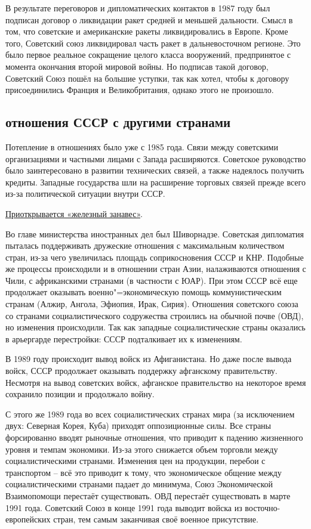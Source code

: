 В результате переговоров и дипломатических контактов в 1987 году был подписан договор о ликвидации ракет средней и меньшей дальности. Смысл в том, что советские и американские ракеты ликвидировались в Европе. Кроме того, Советский союз ликвидировал часть ракет в дальневосточном регионе. Это было первое реальное сокращение целого класса вооружений, предпринятое с момента окончания второй мировой войны. Но подписав такой договор, Советский Союз пошёл на большие уступки, так как хотел, чтобы к договору присоединились Франция и Великобритания, однако этого не произошло.

\subsection{отношения СССР с другими странами}
Потепление в отношениях было уже с 1985 года. Связи между советскими организациями и частными лицами с Запада расширяются. Советское руководство было заинтересовано в развитии технических связей, а также надеялось получить кредиты. Западные государства шли на расширение торговых связей прежде всего из-за политической ситуации внутри СССР.

\underline{Приоткрывается «железный занавес»}. 

Во главе министерства иностранных дел был Шиворнадзе. Советская дипломатия пыталась поддерживать дружеские отношения с максимальным количеством стран, из-за чего увеличилась площадь соприкосновения СССР и КНР. Подобные же процессы происходили и в отношении стран Азии, налаживаются отношения с Чили, с африканскими странами (в частности с ЮАР). При этом СССР всё еще продолжает оказывать военно"=экономическую помощь коммунистическим странам (Алжир, Ангола, Эфиопия, Ирак, Сирия). Отношения советского союза со странами социалистического содружества строились на обычной почве (ОВД), но изменения происходили. Так как западные социалистические страны оказались в арьергарде перестройки: СССР подталкивает их к изменениям.

В 1989 году происходит вывод войск из Афиганистана. Но даже после вывода войск, СССР продолжает оказывать поддержку афганскому правительству. Несмотря на вывод советских войск, афганское правительство на некоторое время сохранило позиции и продолжало войну.

С этого же 1989 года во всех социалистических странах мира (за исключением двух: Северная Корея, Куба) приходят оппозиционные силы. Все страны форсированно вводят рыночные отношения, что приводит к падению жизненного уровня и темпам экономики. Из-за этого снижается объем торговли между социалистическими странами. Изменения цен на продукции, перебои с транспортом – всё это приводит к тому, что экономическое общение между социалистическими странами падает до минимума, Союз Экономической Взаимопомощи перестаёт существовать. ОВД перестаёт существовать в марте 1991 года. Советский Союз в конце 1991 года выводит войска из восточно-европейских стран, тем самым заканчивая своё военное присутствие. 

